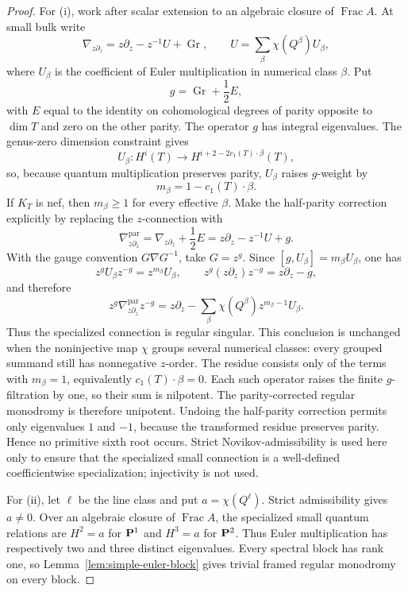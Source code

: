 \begin{proof}
For (i), work after scalar extension to an algebraic closure of
\(\operatorname{Frac}A\).  At small bulk write
\[
 \nabla_{z\partial_z}=z\partial_z-z^{-1}U+\operatorname{Gr},
 \qquad
 U=\sum_{\beta}\chi(Q^\beta)U_\beta,
\]
where \(U_\beta\) is the coefficient of Euler multiplication in numerical
class \(\beta\).  Put
\[
 g=\operatorname{Gr}+\frac12E,
\]
with \(E\) equal to the identity on cohomological degrees of parity
opposite to \(\dim T\) and zero on the other parity.  The operator \(g\) has
integral eigenvalues.  The genus-zero dimension constraint gives
\[
 U_\beta:H^i(T)\longrightarrow
 H^{i+2-2c_1(T)\cdot\beta}(T),
\]
so, because quantum multiplication preserves parity, \(U_\beta\) raises
\(g\)-weight by
\[
 m_\beta=1-c_1(T)\cdot\beta.
\]
If \(K_T\) is nef, then \(m_\beta\ge1\) for every effective
\(\beta\).  Make the half-parity correction explicitly by replacing the
\(z\)-connection with
\[
 \nabla^{\mathrm{par}}_{z\partial_z}
 =\nabla_{z\partial_z}+\frac12E
 =z\partial_z-z^{-1}U+g.
\]
With the gauge convention \(G\nabla G^{-1}\), take \(G=z^g\).  Since
\([g,U_\beta]=m_\beta U_\beta\), one has
\[
 z^gU_\beta z^{-g}=z^{m_\beta}U_\beta,
 \qquad
 z^g(z\partial_z)z^{-g}=z\partial_z-g,
\]
and therefore
\[
 z^g\nabla^{\mathrm{par}}_{z\partial_z}z^{-g}
 =z\partial_z-
   \sum_\beta \chi(Q^\beta)z^{m_\beta-1}U_\beta.
\]
Thus the specialized connection is regular singular.  This conclusion is
unchanged when the noninjective map \(\chi\) groups several numerical
classes: every grouped summand still has nonnegative \(z\)-order.
The residue consists only of the terms with \(m_\beta=1\), equivalently
\(c_1(T)\cdot\beta=0\).  Each such operator raises the finite
\(g\)-filtration by one, so their sum is nilpotent.  The parity-corrected
regular monodromy is therefore unipotent.  Undoing the half-parity correction
permits only eigenvalues \(1\) and \(-1\), because the transformed residue
preserves parity.  Hence no primitive sixth root occurs.  Strict
Novikov-admissibility is used here only to ensure that the specialized small
connection is a well-defined coefficientwise specialization; injectivity is
not used.

For (ii), let \(\ell\) be the line class and put
\(a=\chi(Q^\ell)\).  Strict admissibility gives \(a\ne0\).  Over an
algebraic closure of \(\operatorname{Frac}A\), the specialized small
quantum relations are \(H^2=a\) for \(\mathbf P^1\) and \(H^3=a\) for
\(\mathbf P^2\).  Thus Euler multiplication has respectively two and three
distinct eigenvalues.
Every spectral block has rank one, so
Lemma~\ref{lem:simple-euler-block} gives trivial framed regular monodromy
on every block.


\end{proof}
